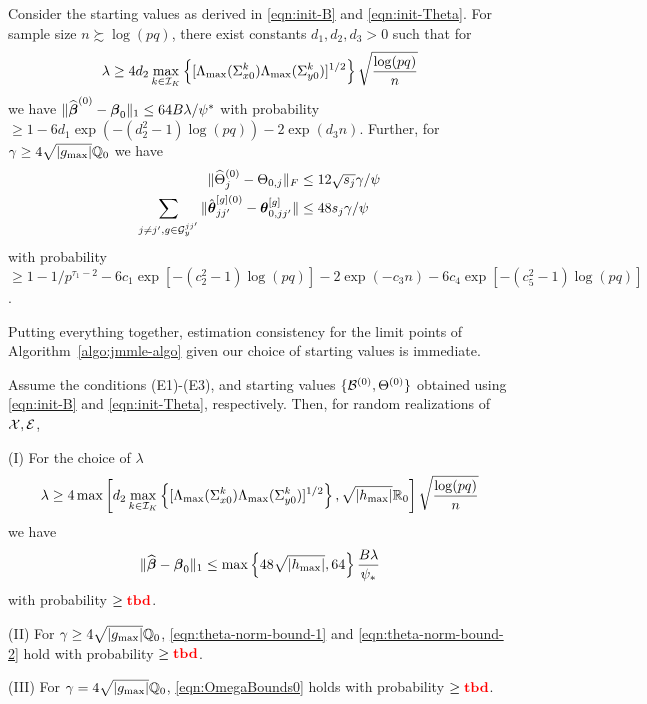 \begin{Theorem}
Consider the starting values as derived in \eqref{eqn:init-B} and \eqref{eqn:init-Theta}. For sample size $n \succsim \log(pq)$, there exist constants $d_1, d_2, d_3>0$ such that for
%
\[
\lambda \geq 4 d_2 \max_{k \in {\cal{I}}_K} \left\{ [\Lambda_{\max} (\Sigma_{x 0}^k) \Lambda_{\max} (\Sigma_{y 0}^k)]^{1/2} \right\}
\sqrt{ \frac{\log (pq)}{n}}
\]
%
we have $\| \widehat {{\boldsymbol{\beta}}}^{(0)} - {\boldsymbol{\beta}}_0 \|_1 \leq 64 B \lambda/\psi^*$ with probability $\geq 1 - 6d_1 \exp( -(d_2^2-1) \log(pq)) - 2 \exp(d_3 n)$. Further, for $\gamma \geq 4\sqrt{| g_{\max}|} {\mathbb{Q}}_0$ we have
%
\begin{align*}
\| \widehat \Theta_j^{(0)} - \Theta_{0,j} \|_F & \leq 12 \sqrt{s_j} \gamma / \psi\\
\sum_{j \neq j', g \in {\cal{G}}_y^{jj'}} \| \hat {{\boldsymbol{\theta}}}_{jj'}^{[g](0)} - {\boldsymbol{\theta}}_{0,jj'}^{[g]} \| & \leq 48 s_j \gamma / \psi
\end{align*}
%
with probability $\geq 1 - 1/p^{\tau_1-2} - 6c_1 \exp [-(c_2^2-1) \log(pq)] - 2 \exp (- c_3 n) - 6c_4 \exp [-(c_5^2-1) \log(pq)]$.
\end{Theorem}
%

Putting everything together, estimation consistency for the limit points of Algorithm~\ref{algo:jmmle-algo} given our choice of starting values is immediate.

\begin{Corollary}\label{corollary:jmmle-final}
Assume the conditions (E1)-(E3), and starting values $\{ {\cal{B}}^{(0)}, \Theta^{(0)} \}$ obtained using \eqref{eqn:init-B} and \eqref{eqn:init-Theta}, respectively. Then, for random realizations of ${\cal{X}}, {\cal{E}}$,
%

\vspace{1em}
\noindent (I) For the choice of $\lambda$
%
$$
\lambda \geq 4 \max \left[ d_2 \max_{k \in {\cal{I}}_K} \left\{ [\Lambda_{\max} (\Sigma_{x 0}^k) \Lambda_{\max} (\Sigma_{y 0}^k)]^{1/2} \right\}, \sqrt{| h_{\max}|} {\mathbb{R}}_0 \right] \sqrt{\frac{\log(pq)}{n}}
$$
%
we have
%
$$
\| \widehat {{\boldsymbol{\beta}}} - {\boldsymbol{\beta}}_0 \|_1 \leq \max \left\{ 48 \sqrt{ | h_{\max} |}, 64 \right\} \frac{B \lambda}{\psi_*}
$$
%
with probability $\geq {\color{red} \bf tbd}$.

\vspace{1em}
\noindent (II) For $\gamma \geq 4 \sqrt{ | g_{\max} |} {\mathbb{Q}}_0 $, \eqref{eqn:theta-norm-bound-1} and \eqref{eqn:theta-norm-bound-2} hold with probability $\geq {\color{red} \bf tbd}$.

\vspace{1em}
\noindent (III) For $\gamma = 4 \sqrt{ | g_{\max} |} {\mathbb{Q}}_0 $, \eqref{eqn:OmegaBounds0} holds with probability $\geq {\color{red} \bf tbd}$.
\end{Corollary}